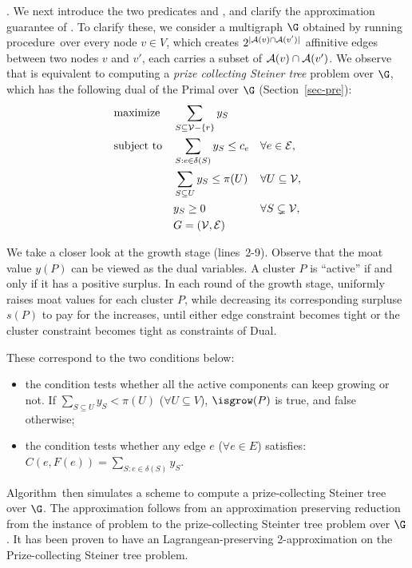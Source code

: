 \vspace{1ex}
.
We next introduce the two predicates \isgrow and \ismerge,
and clarify the approximation guarantee of
\approxabd. To clarify these, we
consider a multigraph $\G$ obtained by
running procedure~\updateAE over every node
$v\in V$, which creates $2^{|\A(v)\cap\A(v')|}$
affinitive edges between two nodes $v$ and $v'$,
each carries a subset of $\A(v)\cap\A(v')$.
We observe that \abd is equivalent to
computing a {\em prize collecting Steiner tree} problem
over $\G$, which has the following
dual of the Primal \abd over $\G$ (Section~\ref{sec-pre}):
\begin{equation*}
\label{eqn_PCST_dual}
\begin{alignedat}{3}
&\textrm{maximize} \quad &&\sum_{S \subseteq \V -\{r\}}y_S\\
&\textrm{subject to} \quad &&\sum_{S: e \in \delta(S)}y_S \leq c_e \quad &&\forall e \in \E,\\
&\quad &&\sum_{S \subseteq U}y_S \leq \pi(U) \quad &&\forall U \subseteq \V,\\
&\quad &&y_S \geq 0 \quad &&\forall S \subsetneq \V,\\
&\quad && G = (\V, \E)
\end{alignedat}
\end{equation*}

We take a closer look at the growth stage
(lines~2-9). Observe that the moat value
$y(P)$ can be viewed as the dual variables.
A cluster $P$ is ``active'' if and only if it has a
positive surplus. In each round of the growth stage, \approxabd uniformly raises moat values for each
cluster $P$, while decreasing its corresponding surpluse $s(P)$ to pay for the increases, until either edge constraint becomes tight or the cluster constraint becomes tight as constraints of Dual.

These correspond to the two conditions below:

\begin{itemize}
\item the condition \isgrow tests
whether all the active components can keep growing or not. If ${\sum_{S \subseteq U}y_S < \pi(U)}$ (${\forall U \subseteq V }$), $\isgrow(P)$ is true, and false otherwise;
\item the condition \ismerge tests whether any edge $e$ (${\forall e \in E}$) satisfies: ${C(e, F(e)) = \sum_{S: e \in \delta(S)}y_S}$.
\end{itemize}
Algorithm~\approxabd then simulates a \GW scheme to
compute a prize-collecting Steiner tree
over $\G$. The approximation follows from
an approximation preserving reduction
from the instance of \abd problem to
the prize-collecting Steinter tree
problem over $\G$. It has been proven to have an Lagrangean-preserving 2-approximation \cite{feofiloff2010note,chudak2004approximate} on the Prize-collecting Steiner tree problem.



